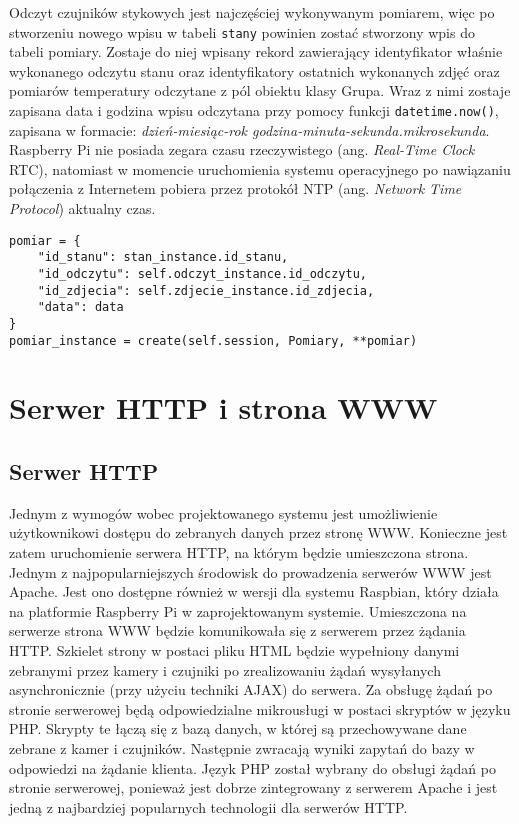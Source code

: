 \documentclass[a4paper,11pt,twoside]{article}
\begin{document}
Odczyt czujników stykowych jest najczęściej wykonywanym pomiarem, więc po stworzeniu nowego wpisu w tabeli \texttt{stany} powinien zostać stworzony wpis do tabeli pomiary. Zostaje do niej wpisany rekord zawierający identyfikator właśnie wykonanego odczytu stanu oraz identyfikatory ostatnich wykonanych zdjęć oraz pomiarów temperatury odczytane z pól obiektu klasy Grupa. Wraz z nimi zostaje zapisana data i godzina wpisu odczytana przy pomocy funkcji \texttt{datetime.now()}, zapisana w formacie: \textit{dzień-miesiąc-rok godzina-minuta-sekunda.mikrosekunda}. Raspberry Pi nie posiada zegara czasu rzeczywistego (ang. \textit{Real-Time Clock} RTC), natomiast w momencie uruchomienia systemu operacyjnego po nawiązaniu połączenia z Internetem pobiera przez protokół NTP (ang. \textit{Network Time Protocol}) aktualny czas.
\begin{lstlisting}
pomiar = {
	"id_stanu": stan_instance.id_stanu,
	"id_odczytu": self.odczyt_instance.id_odczytu,
	"id_zdjecia": self.zdjecie_instance.id_zdjecia,
	"data": data
}
pomiar_instance = create(self.session, Pomiary, **pomiar)
\end{lstlisting}

\newpage

\section{Serwer HTTP i strona WWW}

\subsection{Serwer HTTP}
Jednym z wymogów wobec projektowanego systemu jest umożliwienie użytkownikowi dostępu do zebranych danych przez stronę WWW. Konieczne jest zatem uruchomienie serwera HTTP, na którym będzie umieszczona strona. Jednym z najpopularniejszych środowisk do prowadzenia serwerów WWW jest Apache. Jest ono dostępne również w wersji dla systemu Raspbian, który działa na platformie Raspberry Pi w zaprojektowanym systemie. Umieszczona na serwerze strona WWW będzie komunikowała się z serwerem przez żądania HTTP. Szkielet strony w postaci pliku HTML będzie wypełniony danymi zebranymi przez kamery i czujniki po zrealizowaniu żądań wysyłanych asynchronicznie (przy użyciu techniki AJAX) do serwera. Za obsługę żądań po stronie serwerowej będą odpowiedzialne mikrousługi w postaci skryptów w języku PHP. Skrypty te łączą się z bazą danych, w której są przechowywane dane zebrane z kamer i czujników. Następnie zwracają wyniki zapytań do bazy w odpowiedzi na żądanie klienta. Język PHP został wybrany do obsługi żądań po stronie serwerowej, ponieważ jest dobrze zintegrowany z serwerem Apache i jest jedną z najbardziej popularnych technologii dla serwerów HTTP.
\end{document}
